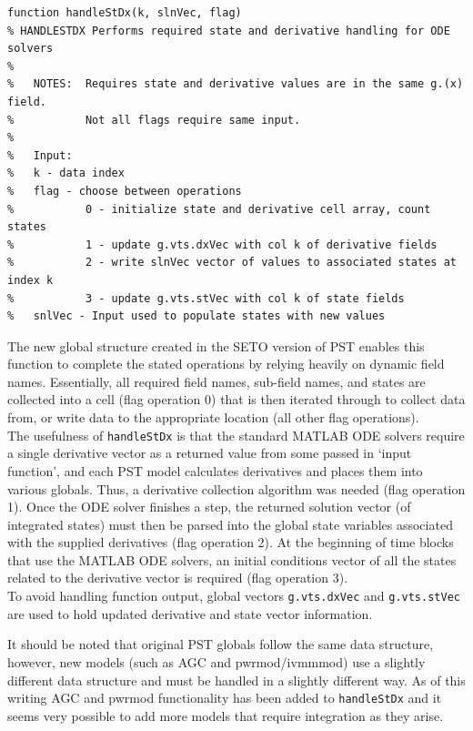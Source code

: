 \documentclass[12pt]{article}
\begin{document}
\begin{verbatim}
function handleStDx(k, slnVec, flag)
% HANDLESTDX Performs required state and derivative handling for ODE solvers
%
%   NOTES:  Requires state and derivative values are in the same g.(x) field.
%           Not all flags require same input.
%
%   Input:
%   k - data index
%   flag - choose between operations
%           0 - initialize state and derivative cell array, count states
%           1 - update g.vts.dxVec with col k of derivative fields
%           2 - write slnVec vector of values to associated states at index k
%           3 - update g.vts.stVec with col k of state fields
%   snlVec - Input used to populate states with new values
\end{verbatim}

The new global structure created in the SETO version of PST enables this function to complete the stated operations by relying heavily on dynamic field names. 
Essentially, all required field names, sub-field names, and states are collected into a cell (flag operation 0) that is then iterated through to collect data from, or write data to the appropriate location (all other flag operations).\\

The usefulness of \verb|handleStDx| is that the standard MATLAB ODE solvers require a single derivative vector as a returned value from some passed in `input function', and each PST model calculates derivatives and places them into various globals. 
Thus, a derivative collection algorithm was needed (flag operation 1).
Once the ODE solver finishes a step, the returned solution vector (of integrated states) must then be parsed into the global state variables associated with the supplied derivatives (flag operation 2).
At the beginning of time blocks that use the MATLAB ODE solvers, an initial conditions vector of all the states related to the derivative vector is required (flag operation 3).\\

To avoid handling function output, global vectors \verb|g.vts.dxVec| and \verb|g.vts.stVec| are used to hold updated derivative and state vector information.

It should be noted that original PST globals follow the same data structure,
however, new models (such as AGC and pwrmod/ivmmmod) use a slightly different data structure and must be handled in a slightly different way.
As of this writing AGC and pwrmod functionality has been added to \verb|handleStDx| and it seems very possible to add more models that require integration as they arise.
\end{document}
